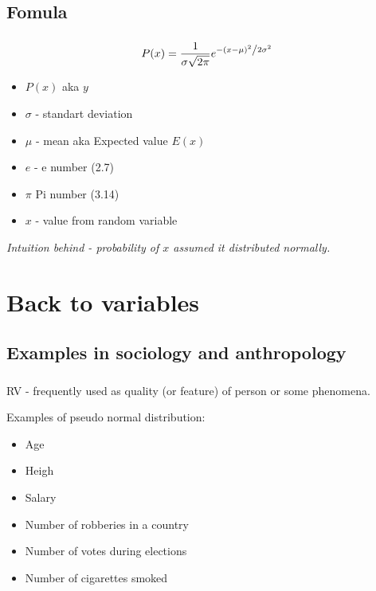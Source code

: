 \documentclass[t, 11pt]{beamer}
\begin{document}
	\subsection{Fomula}
	\begin{frame} 
		\frametitle{\insertsection} 
		\framesubtitle{\insertsubsection}
		$$P(x) = \frac{1}{{\sigma \sqrt {2\pi } }}e^{{{ - \left( {x - \mu } \right)^2 } \mathord{\left/ {\vphantom {{ - \left( {x - \mu } \right)^2 } {2\sigma ^2 }}} \right. \kern-\nulldelimiterspace} {2\sigma ^2 }}}$$
		\begin{itemize}
			\item $P(x)$ aka $y$
			\item $\sigma$ - standart deviation
			\item $\mu$ - mean aka Expected value $E(x)$
			\item $e$ - e number (2.7\texttildelow)
			\item $\pi$ Pi number (3.14\texttildelow)
			\item $x$ - value from random variable
			\end{itemize}
		
	\vspace{0.5cm}
	
	\emph{Intuition behind - probability of $x$ assumed it distributed normally.} 
	\end{frame}

	\section{Back to variables}
	\subsection{Examples in sociology and anthropology}
	\begin{frame} 
		\frametitle{\insertsection} 
		\framesubtitle{\insertsubsection}
	RV - frequently used as quality (or feature) of person or some phenomena. 
	
	Examples of pseudo normal distribution:
	
	\begin{itemize}
		\item Age 
		\item Heigh
		\item Salary 
		\item Number of robberies in a country 
		\item Number of votes  during elections
		\item Number of cigarettes smoked
	\end{itemize}
	
	
	\end{frame}
	
\end{document}
